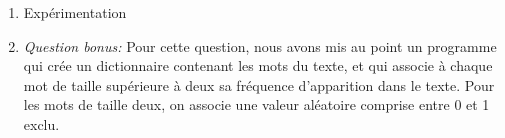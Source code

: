 \documentclass[a4paper,12pt]{report}
\begin{document}
\begin{enumerate}
\item Expérimentation \\

\item \textit{Question bonus:} Pour cette question, nous avons mis au point un programme qui crée un dictionnaire contenant les mots du texte, et qui associe à chaque mot de taille supérieure à deux sa fréquence d'apparition dans le texte. Pour les mots de taille deux, on associe une valeur aléatoire comprise entre 0 et 1 exclu.\\

\end{enumerate}
\end{document}
